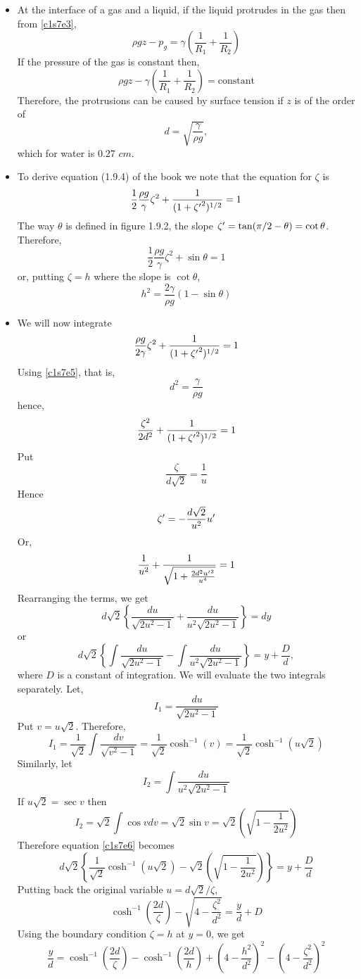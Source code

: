 \begin{itemize}
\item At the interface of a gas and a liquid, if the liquid protrudes in the gas then from \eqref{c1s7e3},
\[
\rho g z - p_g = \gamma\left(\frac{1}{R_1} + \frac{1}{R_2}\right)
\]
If the pressure of the gas is constant then,
\begin{equation}\label{c1s7e4}
\rho g z - \gamma\left(\frac{1}{R_1} + \frac{1}{R_2}\right) = \text{constant}
\end{equation}
Therefore, the protrusions can be caused by surface tension if $z$ is of the order of 
\begin{equation}\label{c1s7e5}
d = \sqrt{\frac{\gamma}{\rho g}},
\end{equation}
which for water is $0.27$ $cm$.

\item To derive equation (1.9.4) of the book we note that the equation for $\zeta$ is
\[
\frac{1}{2}\frac{\rho g}{\gamma}\zeta^2 + \frac{1}{(1 + {\zeta^\prime}^2)^{1/2}} = 1
\]
The way $\theta$ is defined in figure 1.9.2, the slope $\zeta^\prime = \tan(\pi/2 - \theta) = \cot\theta$. Therefore,
\[
\frac{1}{2}\frac{\rho g}{\gamma}\zeta^2 + \sin\theta = 1
\]
or, putting $\zeta = h$ where the slope is $\cot\theta$,
\[
h^2 = \frac{2\gamma}{\rho g}(1 - \sin\theta)
\]

\item We will now integrate
\[
\frac{\rho g}{2\gamma} \zeta^2 + \frac{1}{(1 + {\zeta^\prime}^2)^{1/2}} = 1
\]
Using \eqref{c1s7e5}, that is, 
\[
d^2 = \frac{\gamma}{\rho g}
\]
hence,
\[
\frac{\zeta^2}{2d^2} + \frac{1}{(1 + {\zeta^\prime}^2)^{1/2}} = 1
\]
Put
\[
\frac{\zeta}{d\sqrt{2}} = \frac{1}{u}
\]
Hence
\[
\zeta^\prime = -\frac{d\sqrt{2}}{u^2}u^\prime
\]
Or,
\[
\frac{1}{u^2} + \frac{1}{\sqrt{1 + \frac{2d^2 {u^\prime}^2}{u^4}}} = 1
\]
Rearranging the terms, we get
\[
d\sqrt{2}\left\{\frac{du}{\sqrt{2u^2 - 1}} + \frac{du}{u^2\sqrt{2u^2 - 1}}\right\} = dy
\]
or
\begin{equation}\label{c1s7e6}
d\sqrt{2}\left\{\int\frac{du}{\sqrt{2u^2 - 1}} - \int\frac{du}{u^2\sqrt{2u^2 - 1}}\right\} = y + \frac{D}{d},
\end{equation}
where $D$ is a constant of integration. We will evaluate the two integrals separately. Let,
\[
I_1 = \frac{du}{\sqrt{2u^2 - 1}}
\]
Put $v = u\sqrt{2}$. Therefore,
\[
I_1 = \frac{1}{\sqrt{2}}\int\frac{dv}{\sqrt{v^2 - 1}} = \frac{1}{\sqrt{2}}\cosh^{-1}(v) = \frac{1}{\sqrt{2}}\cosh^{-1}(u\sqrt{2})
\]
Similarly, let
\[
I_2 = \int\frac{du}{u^2\sqrt{2u^2 - 1}}
\]
If $u\sqrt{2} = \sec v$ then
\[
I_2 = \sqrt{2}\int\cos v dv = \sqrt{2}\sin v = \sqrt{2}\left(\sqrt{1 - \frac{1}{2u^2}}\right)
\]
Therefore equation \eqref{c1s7e6} becomes
\[
d\sqrt{2}\left\{\frac{1}{\sqrt{2}}\cosh^{-1}(u\sqrt{2}) - \sqrt{2}\left(\sqrt{1 - \frac{1}{2u^2}}\right)\right\} = y + \frac{D}{d}
\]
Putting back the original variable $u = d\sqrt{2}/\zeta$,
\[
\cosh^{-1}\left(\frac{2d}{\zeta}\right) - \sqrt{4 - \frac{\zeta^2}{d^2}}= \frac{y}{d} + D
\]
Using the boundary condition $\zeta = h$ at $y = 0$, we get
\[
\frac{y}{d} = \cosh^{-1}\left(\frac{2d}{\zeta}\right) - \cosh^{-1}\left(\frac{2d}{h}\right) + \left(4 - \frac{h^2}{d^2}\right)^2 - \left(4 - \frac{\zeta^2}{d^2}\right)^2
\]


\end{itemize}
